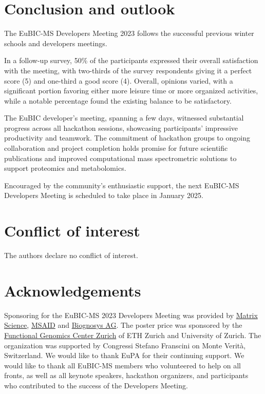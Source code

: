 \section{Conclusion and outlook}
The EuBIC-MS Developers Meeting 2023 follows the successful previous winter schools and developers meetings.

In a follow-up survey, 50\% of the participants expressed their overall satisfaction with the meeting, with two-thirds of the survey respondents giving it a perfect score (5) and one-third a good score (4).
Overall, opinions varied, with a significant portion favoring either more leisure time or more organized activities, while a notable percentage found the existing balance to be satisfactory.
    
The EuBIC developer's meeting, spanning a few days, witnessed substantial progress across all hackathon sessions, showcasing participants' impressive productivity and teamwork. The commitment of hackathon groups to ongoing collaboration and project completion holds promise for future scientific publications and improved computational mass spectrometric solutions to support proteomics and metabolomics.

Encouraged by the community’s enthusiastic support, the next EuBIC-MS Developers Meeting is scheduled to take place in January 2025.
 
\section{Conflict of interest}
The authors declare no conflict of interest.
 
\section{Acknowledgements}
Sponsoring for the EuBIC-MS 2023 Developers Meeting was provided by \href{https://www.matrixscience.com/}{Matrix Science}, \href{https://www.msaid.de/}{MSAID} and \href{https://biognosys.com/}{Biognosys AG}. The poster price was sponsored by the \href{https://fgcz.ch}{Functional Genomics Center Zurich} of ETH Zurich and University of Zurich. The organization was supported by Congressi Stefano Franscini on Monte Verità, Switzerland. We would like to thank EuPA for their continuing support. We would like to thank all EuBIC-MS members who volunteered to help on all fronts, as well as all keynote speakers, hackathon organizers, and participants who contributed to the success of the Developers Meeting.

